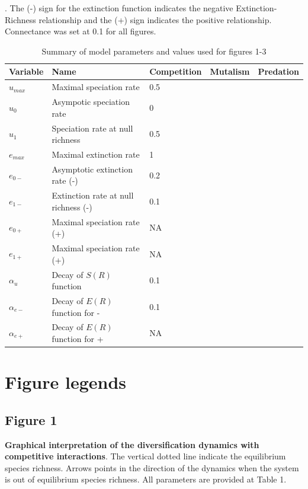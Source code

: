 \documentclass[12pt]{article}
\begin{document}
\begin{table}[]
\caption{Summary of model parameters and values used for figures 1-3}. The (-) sign for the extinction function indicates the negative Extinction-Richness relationship and the (+) sign indicates the positive relationship. Connectance was set at 0.1 for all figures.

\begin{tabular}{lllll}
\hline
Variable & Name & Competition & Mutalism & Predation \\
\hline
$u_{max}$ 		& Maximal speciation rate 				& 0.5	& 		& 		\\ 
$u_{0}$			& Asympotic speciation rate 			& 0		& 		& 		\\
$u_{1}$			& Speciation rate at null richness 		& 0.5	& 		& 		\\
$e_{max}$		& Maximal extinction rate 				& 1		& 		& 		\\
$e_{0-}$		& Asymptotic extinction rate (-) 		& 0.2	& 		& 		\\
$e_{1-}$		& Extinction rate at null richness (-) 	& 0.1	& 		& 		\\
$e_{0+}$		& Maximal speciation rate (+) 			& NA	& 		& 		\\
$e_{1+}$		& Maximal speciation rate (+)			& NA	& 		& 		\\
$\alpha_{u}$	& Decay of $S(R)$ function 				& 0.1	& 		& 		\\
$\alpha_{e-}$	& Decay of $E(R)$ function for - 		& 0.1	& 		& 		\\
$\alpha_{e+}$	& Decay of $E(R)$ function for +		& NA	& 		& 		\\
\hline
\end{tabular}
\end{table}

\newpage

\section*{Figure legends}

\subsection*{Figure 1}

\textbf{Graphical interpretation of the diversification dynamics with competitive interactions}. The vertical dotted line indicate the equilibrium species richness. Arrows points in the direction of the dynamics when the system is out of equilibrium species richness. All parameters are provided at Table 1. 
\end{document}
